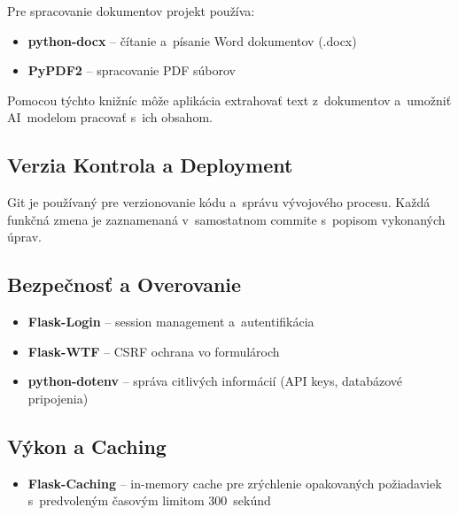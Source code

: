         Pre spracovanie dokumentov projekt používa:

\begin{itemize}
  \item \textbf{python-docx} -- čítanie a~písanie Word dokumentov (.docx)
  \item \textbf{PyPDF2} -- spracovanie PDF súborov
\end{itemize}

        Pomocou týchto knižníc môže aplikácia extrahovať text z~dokumentov a~umožniť
AI~modelom pracovať s~ich obsahom.

\subsection{Verzia Kontrola a Deployment}

        Git je používaný pre verzionovanie kódu a~správu vývojového procesu. Každá
funkčná zmena je zaznamenaná v~samostatnom commite s~popisom vykonaných úprav.

\subsection{Bezpečnosť a Overovanie}

\begin{itemize}
  \item \textbf{Flask-Login} -- session management a~autentifikácia
  \item \textbf{Flask-WTF} -- CSRF ochrana vo formulároch
  \item \textbf{python-dotenv} -- správa citlivých informácií (API keys, databázové pripojenia)
\end{itemize}

\subsection{Výkon a Caching}

\begin{itemize}
  \item \textbf{Flask-Caching} -- in-memory cache pre zrýchlenie opakovaných požiadaviek
        s~predvoleným časovým limitom 300~sekúnd
\end{itemize}
